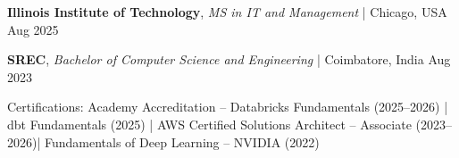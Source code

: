



\begin{cvhonors}

  \cvhonor
    { {\bf Illinois Institute of Technology}, \textit{MS in IT and Management} | Chicago, USA \hspace{2.5em} } %
    {Aug 2025} %

  \cvhonor
    { {\bf SREC}, \textit{Bachelor of Computer Science and Engineering} | Coimbatore, India \hspace{2.9em} } 
    {Aug 2023} %
\end{cvhonors}

\begin{cvparagraph}
{\normalsize{ Certifications:} Academy Accreditation – Databricks Fundamentals (2025–2026) | dbt Fundamentals (2025) | AWS Certified Solutions Architect – Associate (2023–2026)| Fundamentals of Deep Learning – NVIDIA (2022)\\}
\end{cvparagraph}




    
